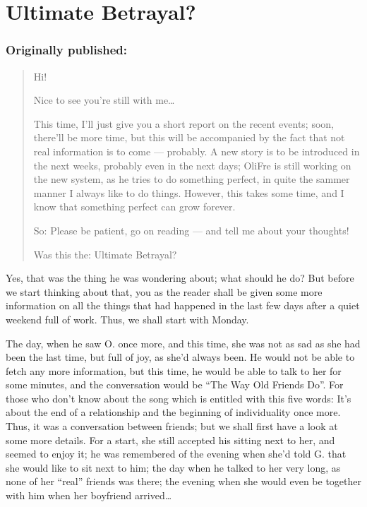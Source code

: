 \chapter{Ultimate Betrayal?}
\label{cha:ultimate-betrayal}
\subsection*{Originally published: }
\begin{quote}
Hi!

Nice to see you're still with me\ldots

This time, I'll just give you a short report on the recent events; soon, there'll be more time, but this will be accompanied by the fact that not real information is to come --- probably. A new story is to be introduced in the next weeks, probably even in the next days; OliFre is still working on the new system, as he tries to do something perfect, in quite the sammer manner I always like to do things. However, this takes some time, and I know that something perfect can grow forever.

So: Please be patient, go on reading --- and tell me about your thoughts!

Was this the: Ultimate Betrayal?
\end{quote}

Yes, that was the thing he was wondering about; what should he do?
But before we start thinking about that, you as the reader shall be given some more information on all the things that had happened in the last few days after a quiet weekend full of work. 
Thus, we shall start with Monday.

The day, when he saw O. once more, and this time, she was not as sad as she had been the last time, but full of joy, as she'd always been. He would not be able to fetch any more information, but this time, he would be able to talk to her for some minutes, and the conversation would be \enquote{The Way Old Friends Do}. For those who don't know about the song which is entitled with this five words: It's about the end of a relationship and the beginning of individuality once more. Thus, it was a conversation between friends; but we shall first have a look at some more details. For a start, she still accepted his sitting next to her, and seemed to enjoy it; he was remembered of the evening when she'd told G. that she would like to sit next to him; the day when he talked to her very long, as none of her \enquote{real} friends was there; the evening when she would even be together with him when her boyfriend arrived\ldots

